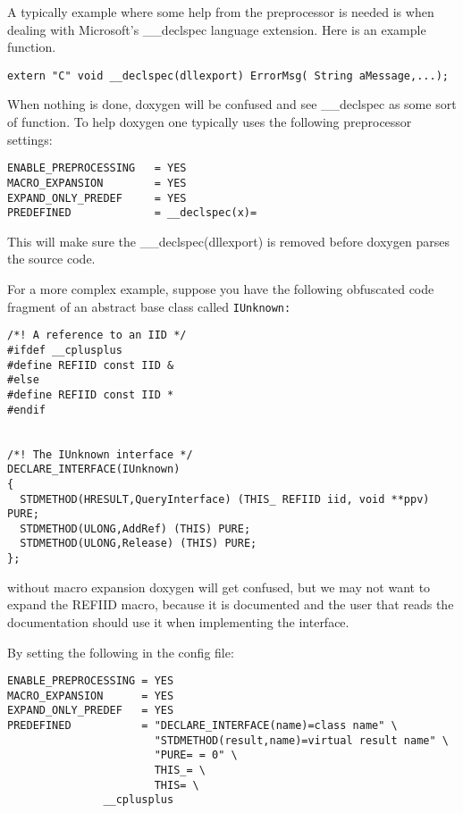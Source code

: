 A typically example where some help from the preprocessor is needed is when dealing with Microsoft's \_\-\_\-declspec language extension. Here is an example function.



\footnotesize\begin{verbatim}
extern "C" void __declspec(dllexport) ErrorMsg( String aMessage,...);
\end{verbatim}
\normalsize


When nothing is done, doxygen will be confused and see \_\-\_\-declspec as some sort of function. To help doxygen one typically uses the following preprocessor settings:



\footnotesize\begin{verbatim}
ENABLE_PREPROCESSING   = YES
MACRO_EXPANSION        = YES
EXPAND_ONLY_PREDEF     = YES
PREDEFINED             = __declspec(x)=
\end{verbatim}
\normalsize


This will make sure the \_\-\_\-declspec(dllexport) is removed before doxygen parses the source code.

For a more complex example, suppose you have the following obfuscated code fragment of an abstract base class called {\tt IUnknown:} 



\footnotesize\begin{verbatim}
/*! A reference to an IID */
#ifdef __cplusplus
#define REFIID const IID &
#else
#define REFIID const IID *
#endif


/*! The IUnknown interface */
DECLARE_INTERFACE(IUnknown)
{
  STDMETHOD(HRESULT,QueryInterface) (THIS_ REFIID iid, void **ppv) PURE;
  STDMETHOD(ULONG,AddRef) (THIS) PURE;
  STDMETHOD(ULONG,Release) (THIS) PURE;
};
\end{verbatim}
\normalsize


without macro expansion doxygen will get confused, but we may not want to expand the REFIID macro, because it is documented and the user that reads the documentation should use it when implementing the interface.

By setting the following in the config file:



\footnotesize\begin{verbatim}
ENABLE_PREPROCESSING = YES
MACRO_EXPANSION      = YES
EXPAND_ONLY_PREDEF   = YES
PREDEFINED           = "DECLARE_INTERFACE(name)=class name" \
                       "STDMETHOD(result,name)=virtual result name" \
                       "PURE= = 0" \
                       THIS_= \
                       THIS= \
		       __cplusplus
\end{verbatim}
\normalsize


